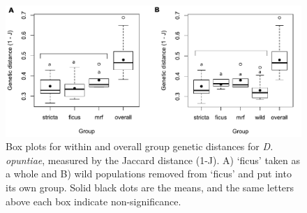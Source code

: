 \begin{figure}[H]
	\centering
	\includegraphics[scale =0.75]{Images/genetic_distances_boxplot.pdf}
	\caption{Box plots for within and overall group genetic distances for \textit{D. opuntiae}, measured by the Jaccard distance (1-J). A) `ficus' taken as a whole and B) wild populations removed from `ficus' and put into its own group. Solid black dots are the means, and the same letters above each box indicate non-significance.}
	\label{fig:genetic_distances_boxplot}
\end{figure}

 

